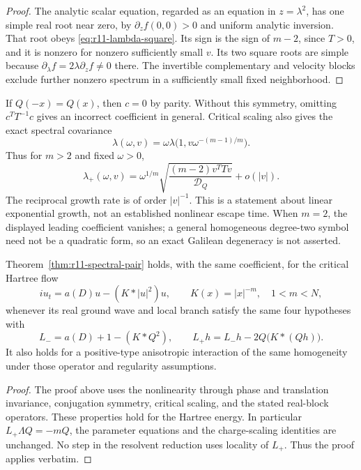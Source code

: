 \begin{proof}
The analytic scalar equation, regarded as an equation in $z=\lambda^2$,
has one simple real root near zero, by
$\partial_zf(0,0)>0$ and uniform analytic inversion. That root obeys
\eqref{eq:r11-lambda-square}. Its sign is the sign of $m-2$, since
$T>0$, and it is nonzero for nonzero sufficiently small $v$.
Its two square roots are simple because
$\partial_\lambda f=2\lambda\partial_zf\ne0$ there.
The invertible complementary and velocity blocks exclude further
nonzero spectrum in a sufficiently small fixed neighborhood.
\end{proof}

\begin{remark}
If $Q(-x)=Q(x)$, then $c=0$ by parity. Without this symmetry, omitting
$c^TT^{-1}c$ gives an incorrect coefficient in general.
Critical scaling also gives the exact spectral covariance
\[
 \lambda(\omega,v)=
 \omega\lambda\bigl(1,v\omega^{-(m-1)/m}\bigr).
\]
Thus for $m>2$ and fixed $\omega>0$,
\[
 \lambda_+(\omega,v)=\omega^{1/m}
 \sqrt{\frac{(m-2)v^TTv}{\mathcal D_Q}}+o(|v|).
\]
The reciprocal growth rate is of order $|v|^{-1}$. This is a statement
about linear exponential growth, not an established nonlinear escape
time. When $m=2$, the displayed leading coefficient vanishes; a general
homogeneous degree-two symbol need not be a quadratic form, so an exact
Galilean degeneracy is not asserted.
\end{remark}

\begin{corollary}
Theorem~\ref{thm:r11-spectral-pair} holds, with the same coefficient,
for the critical Hartree flow
\[
 iu_t=a(D)u-(K*|u|^2)u,
 \qquad K(x)=|x|^{-m},\quad 1<m<N,
\]
whenever its real ground wave and local branch satisfy the same four
hypotheses with
\[
 L_-=a(D)+1-(K*Q^2),\qquad
 L_+h=L_-h-2Q\bigl(K*(Qh)\bigr).
\]
It also holds for a positive-type anisotropic interaction of the same
homogeneity under those operator and regularity assumptions.
\end{corollary}
\begin{proof}
The proof above uses the nonlinearity through phase and translation
invariance, conjugation symmetry, critical scaling, and the stated
real-block operators. These properties hold for the Hartree energy.
In particular $L_+\Lambda Q=-mQ$, the parameter equations and the
charge-scaling identities are unchanged. No step in the resolvent
reduction uses locality of $L_+$. Thus the proof applies verbatim.
\end{proof}

